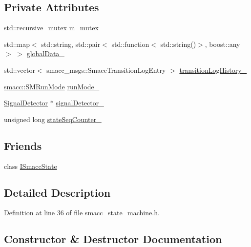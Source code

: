 \subsection*{Private Attributes}
\begin{DoxyCompactItemize}
\item 
std\+::recursive\+\_\+mutex \hyperlink{classsmacc_1_1ISmaccStateMachine_aac785541646e5c517273bf31072505a1}{m\+\_\+mutex\+\_\+}
\item 
std\+::map$<$ std\+::string, std\+::pair$<$ std\+::function$<$ std\+::string()$>$, boost\+::any $>$ $>$ \hyperlink{classsmacc_1_1ISmaccStateMachine_ad2f9dae184ea942db632ac4532a10a91}{global\+Data\+\_\+}
\item 
std\+::vector$<$ smacc\+\_\+msgs\+::\+Smacc\+Transition\+Log\+Entry $>$ \hyperlink{classsmacc_1_1ISmaccStateMachine_af682d5fce5bb7c959e2b8814dae50023}{transition\+Log\+History\+\_\+}
\item 
\hyperlink{namespacesmacc_a3e4f79486ea6ea6342dd3c712d16a4f6}{smacc\+::\+S\+M\+Run\+Mode} \hyperlink{classsmacc_1_1ISmaccStateMachine_a9f8cfbf577f7ae7a48b7a328e2e6b589}{run\+Mode\+\_\+}
\item 
\hyperlink{classsmacc_1_1SignalDetector}{Signal\+Detector} $\ast$ \hyperlink{classsmacc_1_1ISmaccStateMachine_a3982eb671f5f001cb047d3a467789986}{signal\+Detector\+\_\+}
\item 
unsigned long \hyperlink{classsmacc_1_1ISmaccStateMachine_ab41ee07d20715142e2f7c92d551b2bd6}{state\+Seq\+Counter\+\_\+}
\end{DoxyCompactItemize}
\subsection*{Friends}
\begin{DoxyCompactItemize}
\item 
class \hyperlink{classsmacc_1_1ISmaccStateMachine_ab907e4cdbf326246355f56640780162e}{I\+Smacc\+State}
\end{DoxyCompactItemize}


\subsection{Detailed Description}


Definition at line 36 of file smacc\+\_\+state\+\_\+machine.\+h.



\subsection{Constructor \& Destructor Documentation}
